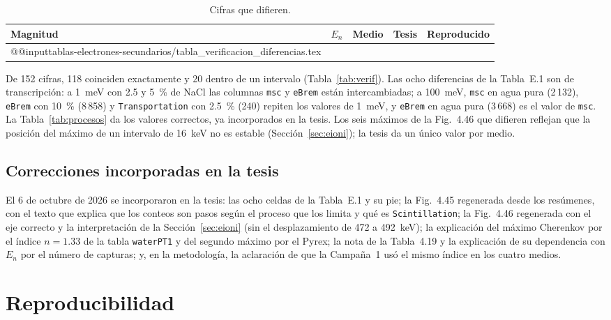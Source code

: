 \documentclass[11pt,a4paper]{article}
\newcommand{\tablas}{tablas-electrones-secundarios}
\newcommand{\var}[1]{\texttt{#1}}
\begin{document}
\begin{table}[H]
\centering\small
\caption{Cifras que difieren.}
\label{tab:verif-dif}
\begin{tabular}{@{}lllrr@{}}
\toprule
Magnitud & $E_n$ & Medio & Tesis & Reproducido \\
\midrule
\csname @@input\endcsname \tablas/tabla_verificacion_diferencias.tex
\bottomrule
\end{tabular}
\end{table}

De 152 cifras, 118 coinciden exactamente y 20 dentro de un intervalo (Tabla~\ref{tab:verif}). Las ocho diferencias de la Tabla~E.1 son de transcripción: a 1~meV con 2.5 y 5~\% de NaCl las columnas \var{msc} y \var{eBrem} están intercambiadas; a 100~meV, \var{msc} en agua pura (2\,132), \var{eBrem} con 10~\% (8\,858) y \var{Transportation} con 2.5~\% (240) repiten los valores de 1~meV, y \var{eBrem} en agua pura (3\,668) es el valor de \var{msc}. La Tabla~\ref{tab:procesos} da los valores correctos, ya incorporados en la tesis. Los seis máximos de la Fig.~4.46 que difieren reflejan que la posición del máximo de un intervalo de 16~keV no es estable (Sección~\ref{sec:eioni}); la tesis da un único valor por medio.

\subsection{Correcciones incorporadas en la tesis}

El 6 de octubre de 2026 se incorporaron en la tesis: las ocho celdas de la Tabla~E.1 y su pie; la Fig.~4.45 regenerada desde los resúmenes, con el texto que explica que los conteos son pasos según el proceso que los limita y qué es \var{Scintillation}; la Fig.~4.46 regenerada con el eje correcto y la interpretación de la Sección~\ref{sec:eioni} (sin el desplazamiento de 472 a 492~keV); la explicación del máximo Cherenkov por el índice $n=1.33$ de la tabla \var{waterPT1} y del segundo máximo por el Pyrex; la nota de la Tabla~4.19 y la explicación de su dependencia con $E_n$ por el número de capturas; y, en la metodología, la aclaración de que la Campaña~1 usó el mismo índice en los cuatro medios.

\section{Reproducibilidad}
\end{document}
